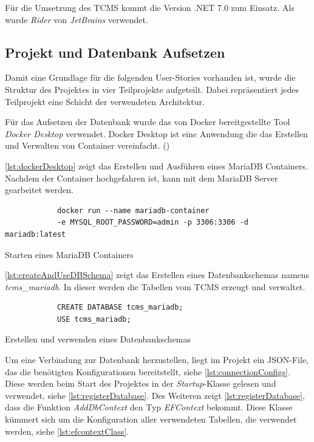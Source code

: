 \documentclass[a4paper, fontsize=11pt, parskip=half, twoside]{scrreprt}
\begin{document}
	Für die Umsetzung des \ac{TCMS} kommt die Version .NET 7.0 zum Einsatz.
	Als  wurde \emph{Rider} von \emph{JetBrains} verwendet.


	\subsection{Projekt und Datenbank Aufsetzen}
	Damit eine Grundlage für die folgenden User-Stories vorhanden ist, wurde die Struktur des Projektes in vier Teilprojekte aufgeteilt.
	Dabei repräsentiert jedes Teilprojekt eine Schicht der verwendeten Architektur.
	
	Für das Aufsetzen der Datenbank wurde das von Docker bereitgestellte Tool \emph{Docker Desktop} verwendet.
	Docker Desktop ist eine Anwendung die das Erstellen und Verwalten von Container vereinfacht. (\textcite{noauthor_docker_2022})
	
	\autoref{lst:dockerDesktop} zeigt das Erstellen und Ausführen eines MariaDB Containers.
	Nachdem der Container hochgefahren ist, kann mit dem MariaDB Server gearbeitet werden.
	
	\begin{listing}[ht]
		\begin{verbatim}
			docker run --name mariadb-container 
			-e MYSQL_ROOT_PASSWORD=admin -p 3306:3306 -d mariadb:latest
		\end{verbatim}
		\caption{Starten eines MariaDB Containers}
		\label{lst:dockerDesktop}
	\end{listing}

	\autoref{lst:createAndUseDBSchema} zeigt das Erstellen eines Datenbankschemas namens \emph{tcms\_mariadb}. 
	In dieser werden die Tabellen vom \ac{TCMS} erzeugt und verwaltet.
	
	\begin{listing}[ht]
		\begin{verbatim}
			CREATE DATABASE tcms_mariadb; 
			USE tcms_mariadb;
		\end{verbatim}
		\caption{Erstellen und verwenden eines Datenbankschemas}
		\label{lst:createAndUseDBSchema}
	\end{listing}

	Um eine Verbindung zur Datenbank herzustellen, liegt im Projekt ein \ac{JSON}-File, das die benötigten Konfigurationen bereitstellt, siehe \autoref{lst:connectionConfigs}.
	Diese werden beim Start des Projektes in der \emph{Startup}-Klasse gelesen und verwendet, siehe \autoref{lst:registerDatabase}.
	Des Weiteren zeigt \autoref{lst:registerDatabase}, dass die Funktion \emph{AddDbContext} den Typ \emph{EFContext} bekommt. 
	Diese Klasse kümmert sich um die Konfiguration aller verwendeten Tabellen, die verwendet werden, siehe \autoref{lst:efcontextClass}.
\end{document}
